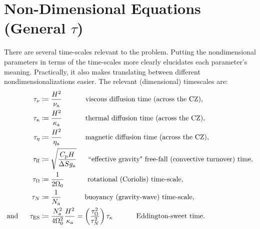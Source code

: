 \documentclass[12pt]{article}
\numberwithin{equation}{section}
\newcommand{\ga}{g_{\rm a}}
\newcommand{\nsqa}{N^2_{\rm a}}
\newcommand{\nua}{\nu_{\rm a}}
\newcommand{\kappaa}{\kappa_{\rm a}}
\newcommand{\etaa}{\eta_{\rm a}}
\begin{document}
	\section{Non-Dimensional Equations (General $\tau$)}\label{sec:eqndgentau}
	There are several time-scales relevant to the problem. Putting the nondimensional parameters in terms of the time-scales more clearly elucidates each parameter's meaning. Practically, it also makes translating between different nondimensionalizations easier. The relevant (dimensional) timescales are:
	\begin{subequations}\label{eq:timescales}
		\begin{align}
			\taunu &\define \frac{H^2}{\nua}\five\five\text{viscous diffusion time (across the CZ)},\\
			\taukappa &\define \frac{H^2}{\kappaa}\five\five\text{thermal diffusion time (across the CZ)},\\
			\taueta &\define \frac{H^2}{\etaa}\five\five\text{magnetic diffusion time (across the CZ)},\\
			\tauff &\define \sqrt{\frac{\cpcap H}{\Delta S \ga}}\five\text{``effective gravity" free-fall (convective turnover) time},\\
			\tauomega &\define \frac{1}{2\omnought}\five\five\text{rotational (Coriolis) time-scale},\\
			\taun &\define \frac{1}{N_{\rm a}}\five\five\text{buoyancy (gravity-wave) time-scale},\\
			\andd \taues &\define \frac{\nsqa}{4\omnought^2}\frac{H^2}{\kappaa}=\left(\frac{\tauomega^2}{\taun^2}\right)\taukappa\five\five\text{Eddington-sweet time}.
		\end{align}
	\end{subequations}
	
\end{document}
